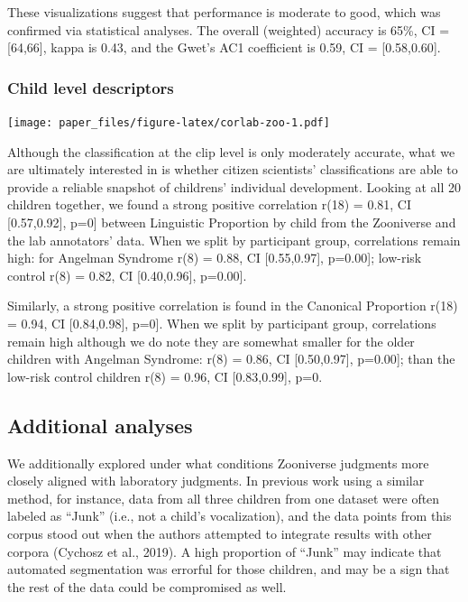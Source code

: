 \documentclass[english,,man,floatsintext]{apa6}
\begin{document}
These visualizations suggest that performance is moderate to good, which was confirmed via statistical analyses. The overall (weighted) accuracy is 65\%, CI = {[}64,66{]}, kappa is 0.43, and the Gwet's AC1 coefficient is 0.59, CI = {[}0.58,0.60{]}.

\hypertarget{child-level-descriptors}{%
\subsubsection{Child level descriptors}\label{child-level-descriptors}}

\texttt{[image: paper\_files/figure-latex/corlab-zoo-1.pdf]}

Although the classification at the clip level is only moderately accurate, what we are ultimately interested in is whether citizen scientists' classifications are able to provide a reliable snapshot of childrens' individual development. Looking at all 20 children together, we found a strong positive correlation r(18) = 0.81, CI {[}0.57,0.92{]}, p=0{]} between Linguistic Proportion by child from the Zooniverse and the lab annotators' data. When we split by participant group, correlations remain high: for Angelman Syndrome r(8) = 0.88, CI {[}0.55,0.97{]}, p=0.00{]}; low-risk control r(8) = 0.82, CI {[}0.40,0.96{]}, p=0.00{]}.

Similarly, a strong positive correlation is found in the Canonical Proportion r(18) = 0.94, CI {[}0.84,0.98{]}, p=0{]}. When we split by participant group, correlations remain high although we do note they are somewhat smaller for the older children with Angelman Syndrome: r(8) = 0.86, CI {[}0.50,0.97{]}, p=0.00{]}; than the low-risk control children r(8) = 0.96, CI {[}0.83,0.99{]}, p=0.

\hypertarget{additional-analyses}{%
\subsection{Additional analyses}\label{additional-analyses}}

We additionally explored under what conditions Zooniverse judgments more closely aligned with laboratory judgments. In previous work using a similar method, for instance, data from all three children from one dataset were often labeled as \enquote{Junk} (i.e., not a child's vocalization), and the data points from this corpus stood out when the authors attempted to integrate results with other corpora (Cychosz et al., 2019). A high proportion of \enquote{Junk} may indicate that automated segmentation was errorful for those children, and may be a sign that the rest of the data could be compromised as well.
\end{document}
